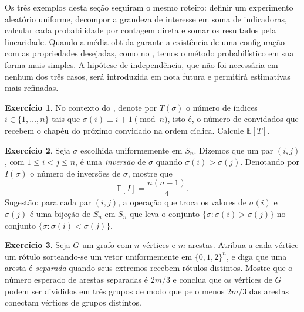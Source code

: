 \documentclass[12pt,portuguese]{article}
\theoremstyle{definition}
\newtheorem{exercise}{Exercício}
\begin{document}
\bigskip

Os três exemplos desta seção seguiram o mesmo roteiro: definir um experimento
aleatório uniforme, decompor a grandeza de interesse em soma de indicadoras,
calcular cada probabilidade por contagem direta e somar os resultados pela
linearidade. Quando a média obtida garante a existência de uma configuração
com as propriedades desejadas, como no , temos
o método probabilístico em sua forma mais simples. A hipótese de
independência, que não foi necessária em nenhum dos três casos, será
introduzida em nota futura e permitirá estimativas mais refinadas.

\begin{exercise}\label{exercise:chapeus-troca-ciclica}
No contexto do , denote por $T(\sigma)$ o
número de índices $i\in\{1,\ldots,n\}$ tais que
$\sigma(i)\equiv i+1\pmod{n}$, isto é, o número de convidados que recebem o
chapéu do próximo convidado na ordem cíclica. Calcule $\mathbb{E}[T]$.
\end{exercise}

\bigskip 

\begin{exercise}\label{exercise:inversoes}
Seja $\sigma$ escolhida uniformemente em $S_n$. Dizemos que um par $(i,j)$,
com $1\leqslant i<j\leqslant n$, é uma \emph{inversão} de $\sigma$ quando
$\sigma(i)>\sigma(j)$. Denotando por $I(\sigma)$ o número de inversões de
$\sigma$, mostre que
\[
\mathbb{E}[I]=\frac{n(n-1)}{4}.
\]
Sugestão: para cada par $(i,j)$, a operação que troca os valores de
$\sigma(i)$ e $\sigma(j)$ é uma bijeção de $S_n$ em $S_n$ que leva o conjunto
$\{\sigma:\sigma(i)>\sigma(j)\}$ no conjunto
$\{\sigma:\sigma(i)<\sigma(j)\}$.
\end{exercise}


\bigskip 

\begin{exercise}\label{exercise:tres-partes}
Seja $G$ um grafo com $n$ vértices e $m$ arestas. Atribua a cada vértice um
rótulo sorteando-se um vetor uniformemente em $\{0,1,2\}^n$, e diga que uma
aresta é \emph{separada} quando seus extremos recebem rótulos distintos.
Mostre que o número esperado de arestas separadas é $2m/3$ e conclua que os
vértices de $G$ podem ser divididos em três grupos de modo que pelo menos
$2m/3$ das arestas conectam vértices de grupos distintos.
\end{exercise}
\end{document}
